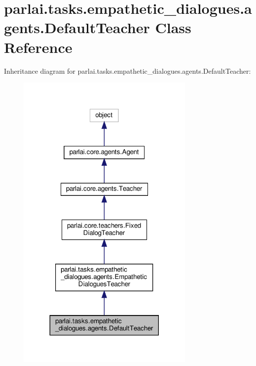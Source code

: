 \hypertarget{classparlai_1_1tasks_1_1empathetic__dialogues_1_1agents_1_1DefaultTeacher}{}\section{parlai.\+tasks.\+empathetic\+\_\+dialogues.\+agents.\+Default\+Teacher Class Reference}
\label{classparlai_1_1tasks_1_1empathetic__dialogues_1_1agents_1_1DefaultTeacher}


Inheritance diagram for parlai.\+tasks.\+empathetic\+\_\+dialogues.\+agents.\+Default\+Teacher\+:
\nopagebreak
\begin{figure}[H]
\begin{center}
\leavevmode
\includegraphics[width=245pt]{d9/d3c/classparlai_1_1tasks_1_1empathetic__dialogues_1_1agents_1_1DefaultTeacher__inherit__graph}
\end{center}
\end{figure}


